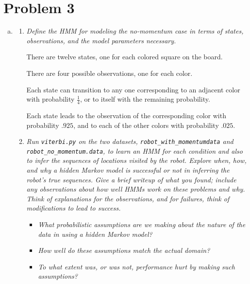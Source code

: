 \documentclass{article}
\begin{document}
\section*{Problem 3}
\begin{enumerate}[(a)]
  \setcounter{enumi}2
\item
  \begin{enumerate}
  \item \emph{Define the HMM for modeling the no-momentum case in terms of
    states, observations, and the model parameters necessary.}

    There are twelve states, one for each colored square on the board.

    There are four possible observations, one for each color.

    Each state can transition to any one corresponding to an adjacent
    color with probability $\frac14$, or to itself with the remaining
    probability.

    Each state leads to the observation of the corresponding color
    with probability $.925$, and to each of the other colors with
    probability $.025$.
  \item \emph{Run \emph{\texttt{viterbi.py}} on the two datasets,
    \emph{\texttt{robot\_with\_momentumdata}} and
    \emph{\texttt{robot\_no\_momentum.data}}, to learn an HMM for each
    condition and also to infer the sequences of locations visited by
    the robot. Explore when, how, and why a hidden Markov model is
    successful or not in inferring the robot's true sequences. Give a
    brief writeup of what you found; include any observations about
    how well HMMs work on these problems and why. Think of
    explanations for the observations, and for failures, think of
    modifications to lead to success.}

    \begin{itemize}
    \item \emph{What probabilistic assumptions are we making about the nature of
      the data in using a hidden Markov model?}

    \item \emph{How well do these assumptions match the actual domain?}

    \item \emph{To what extent was, or was not, performance hurt by making such
      assumptions?}

    \end{itemize}
  \end{enumerate}
\end{enumerate}
\end{document}
